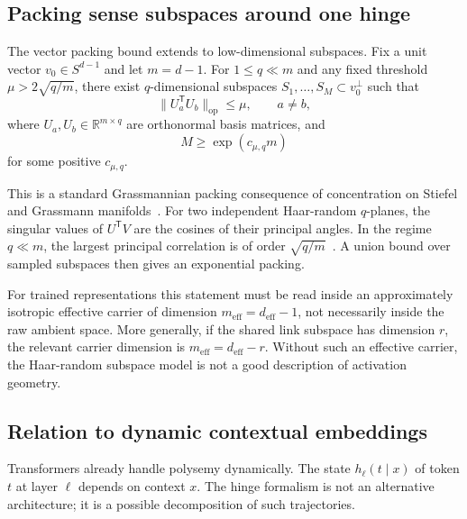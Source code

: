 \documentclass[
  aps,
  reprint,
  superscriptaddress,
  floatfix,
  nofootinbib,
  longbibliography
]{revtex4-2}
\newcommand{\R}{\mathbb{R}}
\newcommand{\Sph}[1]{S^{#1}}
\newcommand{\deff}{d_{\mathrm{eff}}}
\newcommand{\meff}{m_{\mathrm{eff}}}
\newcommand{\T}{^{\mathsf{T}}}
\newcommand{\opnorm}[1]{\lVert #1 \rVert_{\mathrm{op}}}
\begin{document}
\subsection{Packing sense subspaces around one hinge}
\label{sec:grassmann}

The vector packing bound extends to low-dimensional subspaces. Fix a
unit vector $v_0\in\Sph{d-1}$ and let $m=d-1$. For $1\le q\ll m$ and
any fixed threshold $\mu>2\sqrt{q/m}$, there exist
$q$-dimensional subspaces
$S_1,\dots,S_M\subset v_0^\perp$ such that
%
\begin{equation}
\label{eq:grassmann-coherence}
\opnorm{U_a\T U_b}\le \mu,\qquad a\neq b,
\end{equation}
%
where $U_a,U_b\in\R^{m\times q}$ are orthonormal basis matrices, and
%
\begin{equation}
\label{eq:grassmann-count}
M\ge \exp(c_{\mu,q}m)
\end{equation}
%
for some positive $c_{\mu,q}$.

This is a standard Grassmannian packing consequence of concentration
on Stiefel and Grassmann manifolds~\cite{szarek1982nets,conway1996packings}. For
two independent Haar-random $q$-planes, the singular values of
$U\T V$ are the cosines of their principal angles. In the regime
$q\ll m$, the largest principal correlation is of order
$\sqrt{q/m}$~\cite{chikuse2003statistics,absil2006condition,edelman1998random}. A union bound
over sampled subspaces then gives an exponential packing.

For trained representations this statement must be read inside an
approximately isotropic effective carrier of dimension
$\meff=\deff-1$, not necessarily inside the raw ambient space. More
generally, if the shared link subspace has dimension $r$, the relevant
carrier dimension is $\meff=\deff-r$. Without such an effective
carrier, the Haar-random subspace model is not a good description of
activation geometry.

\subsection{Relation to dynamic contextual embeddings}
\label{sec:dynamic}

Transformers already handle polysemy dynamically. The state
$h_\ell(t\mid x)$ of token $t$ at layer $\ell$ depends on context $x$.
The hinge formalism is not an alternative architecture; it is a
possible decomposition of such trajectories.
\end{document}
